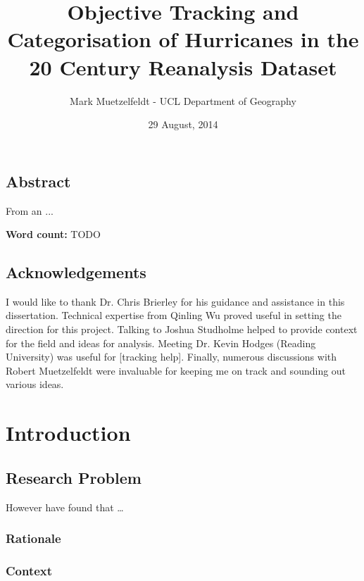 \documentclass[pdftex,12pt,a4paper]{report}
\title{Objective Tracking and Categorisation of Hurricanes in the 20\ts{th} Century Reanalysis Dataset}
\author{Mark Muetzelfeldt - UCL Department of Geography}
\date{29 August, 2014}
\begin{document}


\onehalfspacing
\section*{Abstract}

From an ...

\begin{center}
\textbf{Word count:} TODO
\end{center}

\section*{Acknowledgements}

I would like to thank Dr. Chris Brierley for his guidance and assistance in this dissertation.
Technical expertise from Qinling Wu proved useful in setting the direction for this project. 
Talking to Joshua Studholme helped to provide context for the field and ideas for analysis. %
Meeting Dr. Kevin Hodges (Reading University) was useful for [tracking help]. 
Finally, numerous discussions with Robert Muetzelfeldt were invaluable for keeping me on track and 
sounding out various ideas.

\newpage


\tableofcontents

\chapter{Introduction}

\section{Research Problem}

However \textcite{walshObjective1997} have found that \dots

\subsection{Rationale}

\subsection{Context}
\end{document}
